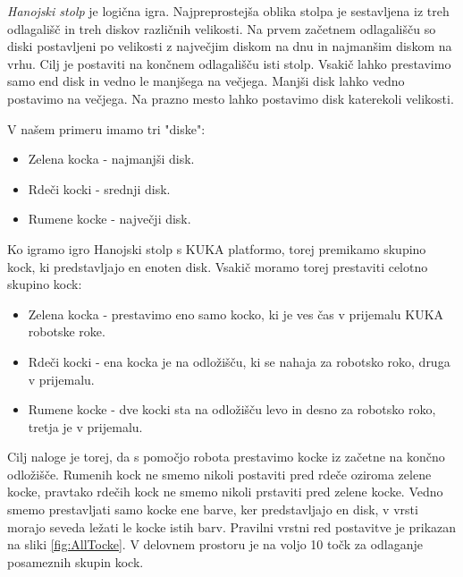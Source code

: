 
\emph{Hanojski stolp} je logična igra. Najpreprostejša oblika stolpa je sestavljena iz treh odlagališč in treh diskov različnih velikosti. Na prvem začetnem odlagališču so diski postavljeni po velikosti z največjim diskom na dnu in najmanšim diskom na vrhu. Cilj je postaviti na končnem odlagališču isti stolp. Vsakič lahko prestavimo samo end disk in vedno le manjšega na večjega. Manjši disk lahko vedno postavimo na večjega. Na prazno mesto lahko postavimo disk katerekoli velikosti.

V našem primeru imamo tri "diske":
\begin{itemize}
\item Zelena kocka - najmanjši disk.
\item Rdeči kocki - srednji disk.
\item Rumene kocke - največji disk.
\end{itemize}

Ko igramo igro Hanojski stolp s KUKA platformo, torej premikamo skupino kock, ki predstavljajo en enoten disk. Vsakič moramo torej prestaviti celotno skupino kock:

\begin{itemize}
\item Zelena kocka - prestavimo eno samo kocko, ki je ves čas v prijemalu KUKA robotske roke.
\item Rdeči kocki - ena kocka je na odložišču, ki se nahaja za robotsko roko, druga v prijemalu.
\item Rumene kocke - dve kocki sta na odložišču levo in desno za robotsko roko, tretja je v prijemalu.
\end{itemize}

Cilj naloge je torej, da s pomočjo robota prestavimo kocke iz začetne na končno odložišče. Rumenih kock ne smemo nikoli postaviti pred rdeče oziroma zelene kocke, pravtako rdečih kock ne smemo nikoli prstaviti pred zelene kocke. Vedno smemo prestavljati samo kocke ene barve, ker predstavljajo en disk, v vrsti morajo seveda ležati le kocke istih barv. Pravilni vrstni red postavitve je prikazan na sliki \ref{fig:AllTocke}. V delovnem prostoru je na voljo 10 točk za odlaganje posameznih skupin kock.

